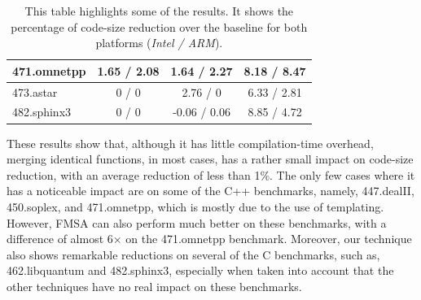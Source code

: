 \begin{table}[]
{\begin{tabular}{|l|c|c|c|}
471.omnetpp                               & 1.65 / 2.08        & 1.64 / 2.27   & 8.18 / 8.47             \\ \hline
473.astar                                 & 0 / 0              & 2.76 / 0      & 6.33 / 2.81             \\ \hline
482.sphinx3                               & 0 / 0              & -0.06 / 0.06  & 8.85 / 4.72             \\ \hline
\end{tabular}
}
\caption{This table highlights some of the results.
         It shows the percentage of code-size reduction over the baseline
         for both platforms (\textit{Intel / ARM}). }
\end{table}

These results show that, although it has little compilation-time overhead,
merging identical functions, in most cases, has a rather small impact on
code-size reduction, with an average reduction of less than 1\%.
The only few cases where it has a noticeable impact are on some of the C++
benchmarks, namely, 447.dealII, 450.soplex, and 471.omnetpp, which is mostly
due to the use of templating. %
However, FMSA can also perform much better on these
benchmarks, with a difference of almost 6$\times$ on the 471.omnetpp benchmark.
Moreover, our technique also shows remarkable reductions on several of the
C benchmarks, such as, 462.libquantum and 482.sphinx3, especially when taken into
account that the other techniques have no real impact on these benchmarks.



